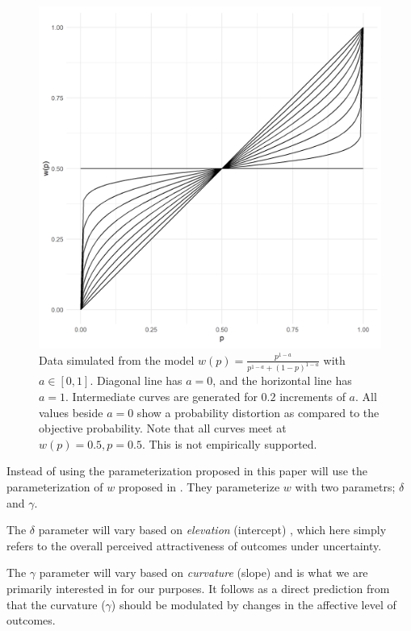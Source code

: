 \documentclass[12pt]{article}
\begin{document}
\begin{figure}[h!]
	\includegraphics[width = \linewidth]{../Figures/oneParam.png}
	\caption{Data simulated from the model
		$w(p) = \frac{p^{1-a}}
		{p^{1-a}+(1-p)^{1-a}}$ with
		$a \in [0, 1]$. Diagonal line has
		$a = 0$, and the horizontal line
		has $a = 1$. Intermediate curves
		are generated for $0.2$ increments
		of $a$. All values beside
		$a = 0$ show a probability distortion
		as compared to the objective probability.
		Note that all curves meet at
		$w(p) = 0.5, p = 0.5$. This is
	not empirically supported.}
\end{figure}

Instead of using the parameterization
proposed in \textcite{rottenstreich2001money}
this paper will use the parameterization
of $w$ proposed in \textcite{gonzalez1999shape}.
They parameterize $w$ with two parametrs;
$\delta$ and $\gamma$.

\vspace{3mm}

The $\delta$ parameter will vary based on
\emph{elevation} (intercept)
\autocite{gonzalez1999shape},
which here simply refers to the overall
perceived attractiveness of outcomes
under uncertainty.

\vspace{3mm}

The $\gamma$ parameter will vary based on
\emph{curvature} (slope)
\autocite{gonzalez1999shape} and is what we
are primarily interested in for our purposes.
It follows as a direct prediction from
\textcite{rottenstreich2001money} that the
curvature ($\gamma$) should be modulated by changes in
the affective level of outcomes. \\
\end{document}
